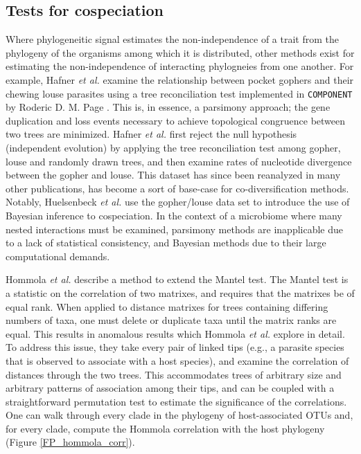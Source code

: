 \subsection{Tests for cospeciation}

Where phylogeneitic signal estimates the non-independence of a trait from the phylogeny of the organisms among which it is distributed, other methods exist for estimating the non-independence of interacting phylogneies from one another. For example, Hafner {\em et al.} \cite{hafner1994disparate} examine the relationship between pocket gophers and their chewing louse parasites using a tree reconciliation test implemented in {\tt COMPONENT} by Roderic D. M. Page \cite{page1993genes}. This is, in essence, a parsimony approach; the gene duplication and loss events necessary to achieve topological congruence between two trees are minimized. Hafner {\em et al.} first reject the null hypothesis (independent evolution) by applying the tree reconciliation test among gopher, louse and randomly drawn trees, and then examine rates of nucleotide divergence between the gopher and louse. This dataset has since been reanalyzed in many other publications, has become a sort of base-case for co-diversification methods. Notably, Huelsenbeck {\em et al.} use the gopher/louse data set to introduce the use of Bayesian inference to cospeciation. \cite{huelsenbeck2000bayesian} In the context of a microbiome where many nested interactions must be examined, parsimony methods are inapplicable due to a lack of statistical consistency, \cite{felsenstein1978cases} and Bayesian methods due to their large computational demands.

Hommola {\em et al.} \cite{hommola2009permutation} describe a method to extend the Mantel test. \cite{mantel1967detection} The Mantel test is a statistic on the correlation of two matrixes, and requires that the matrixes be of equal rank. When applied to distance matrixes for trees containing differing numbers of taxa, one must delete or duplicate taxa until the matrix ranks are equal. This results in anomalous results which Hommola {\em et al.} explore in detail. To address this issue, they take every pair of linked tips (e.g., a parasite species that is observed to associate with a host species), and examine the correlation of distances through the two trees. This accommodates trees of arbitrary size and arbitrary patterns of association among their tips, and can be coupled with a straightforward permutation test to estimate the significance of the correlations. One can walk through every clade in the phylogeny of host-associated OTUs and, for every clade, compute the Hommola correlation with the host phylogeny (Figure \ref{FP_hommola_corr}). 

